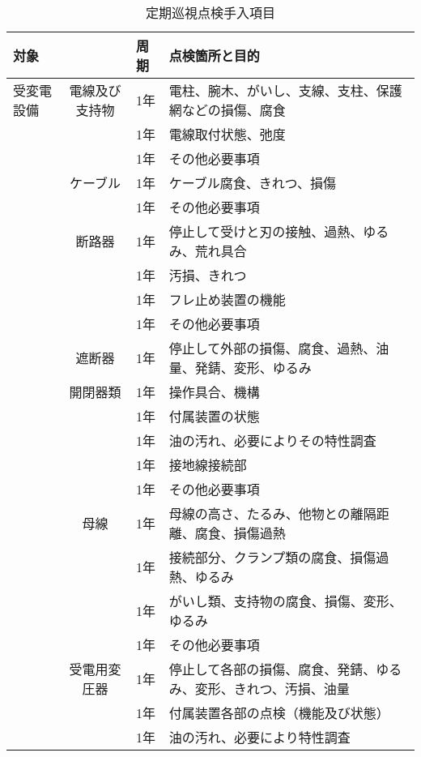 \documentclass[10pt,a4paper,uplatex]{jsarticle}
\begin{document}
\begin{table}[b]
\scriptsize
  \caption{定期巡視点検手入項目}
  \label{定期巡視点検手入項目}
  \begin{tabular}{|l|c|p{1cm}|p{10cm}|} \hline
    対象         & & 周期 & 点検箇所と目的  \\ \hline
受変電設備
    &電線及び支持物  & 1年 & 電柱、腕木、がいし、支線、支柱、保護網などの損傷、腐食  \\
    &              & 1年 & 電線取付状態、弛度  \\
    &              & 1年 & その他必要事項  \\ \cline{2-4}
    &ケーブル       & 1年 & ケーブル腐食、きれつ、損傷  \\
    &              & 1年 & その他必要事項  \\ \cline{2-4}
    &断路器         & 1年 & 停止して受けと刃の接触、過熱、ゆるみ、荒れ具合  \\
    &              & 1年 & 汚損、きれつ  \\
    &              & 1年 & フレ止め装置の機能  \\
    &              & 1年 & その他必要事項  \\ \cline{2-4}
    &遮断器         & 1年 & 停止して外部の損傷、腐食、過熱、油量、発錆、変形、ゆるみ  \\ 
    &開閉器類       & 1年 & 操作具合、機構  \\
    &              & 1年 & 付属装置の状態  \\
    &              & 1年 & 油の汚れ、必要によりその特性調査  \\
    &              & 1年 & 接地線接続部  \\
    &              & 1年 & その他必要事項  \\ \cline{2-4}
    &母線          & 1年 & 母線の高さ、たるみ、他物との離隔距離、腐食、損傷過熱  \\ 
    &              & 1年 & 接続部分、クランプ類の腐食、損傷過熱、ゆるみ  \\
    &              & 1年 & がいし類、支持物の腐食、損傷、変形、ゆるみ  \\
    &              & 1年 & その他必要事項  \\\cline{2-4}
    &受電用変圧器   & 1年 & 停止して各部の損傷、腐食、発錆、ゆるみ、変形、きれつ、汚損、油量  \\
    &              & 1年 & 付属装置各部の点検（機能及び状態）  \\ 
    &              & 1年 & 油の汚れ、必要により特性調査  \\ 

\end{tabular}
\end{table}
\end{document}
